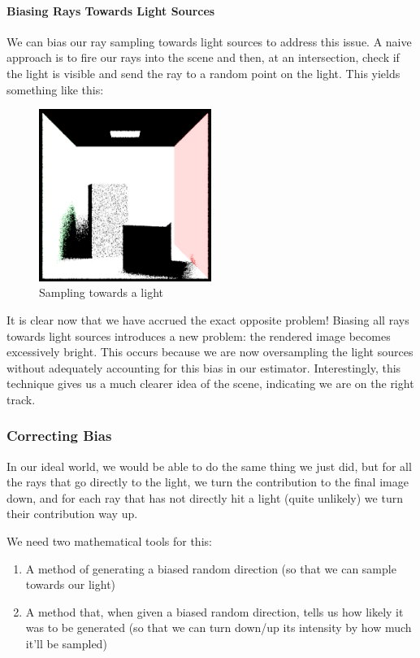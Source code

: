 \documentclass[12pt]{article}
\begin{document}
\paragraph{Biasing Rays Towards Light Sources}

We can bias our ray sampling towards light sources to address this issue. A naive approach is to fire our rays into the scene and then, at an intersection, check if the light is visible and send the ray to a random point on the light. This yields something like this:

\begin{figure}[H]
    \centering
    \includegraphics[width=0.5\textwidth]{images/one_samp/towards_light_no_pdf.png}
    \caption{Sampling towards a light}
    \label{fig:onesampimportancenopdf}
\end{figure}

It is clear now that we have accrued the exact opposite problem! Biasing all rays towards light sources introduces a new problem: the rendered image becomes excessively bright. This occurs because we are now oversampling the light sources without adequately accounting for this bias in our estimator. Interestingly, this technique gives us a much clearer idea of the scene, indicating we are on the right track.

\subsubsection{Correcting Bias}


In our ideal world, we would be able to do the same thing we just did, but for all the rays that go directly to the light, we turn the contribution to the final image down, and for each ray that has not directly hit a light (quite unlikely) we turn their contribution way up.

We need two mathematical tools for this:
\begin{enumerate}
    \item A method of generating a biased random direction (so that we can sample towards our light)
    \item A method that, when given a biased random direction, tells us how likely it was to be generated (so that we can turn down/up its intensity by how much it'll be sampled)
\end{enumerate}
\end{document}

